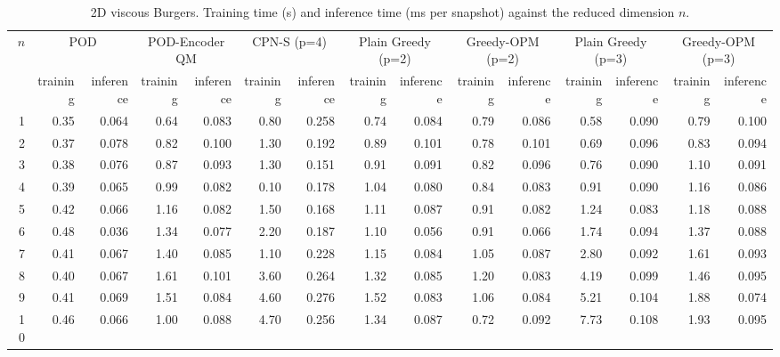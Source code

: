 \begin{table}[tb]
  \centering
  \caption{2D viscous Burgers. Training time (s) and inference time (ms per snapshot) against the reduced dimension \( n \).}
  \label{tab:burgers2d_timings}
  \small
  \setlength{\tabcolsep}{4pt}
  \begin{tabular}{rrrrrrrrrrrrrrr}
    \toprule
    \multirow{2}{*}{\( n \)} & \multicolumn{2}{c}{POD} & \multicolumn{2}{c}{POD-Encoder QM} & \multicolumn{2}{c}{CPN-S (p=4)} & \multicolumn{2}{c}{Plain Greedy (p=2)} & \multicolumn{2}{c}{Greedy-OPM (p=2)} & \multicolumn{2}{c}{Plain Greedy (p=3)} & \multicolumn{2}{c}{Greedy-OPM (p=3)} \\
    \cmidrule(lr){2-3} \cmidrule(lr){4-5} \cmidrule(lr){6-7} \cmidrule(lr){8-9} \cmidrule(lr){10-11} \cmidrule(lr){12-13} \cmidrule(lr){14-15}
     & training & inference & training & inference & training & inference & training & inference & training & inference & training & inference & training & inference \\
    \midrule
    1 & 0.35 & 0.064 & 0.64 & 0.083 & 0.80 & 0.258 & 0.74 & 0.084 & 0.79 & 0.086 & 0.58 & 0.090 & 0.79 & 0.100 \\
    2 & 0.37 & 0.078 & 0.82 & 0.100 & 1.30 & 0.192 & 0.89 & 0.101 & 0.78 & 0.101 & 0.69 & 0.096 & 0.83 & 0.094 \\
    3 & 0.38 & 0.076 & 0.87 & 0.093 & 1.30 & 0.151 & 0.91 & 0.091 & 0.82 & 0.096 & 0.76 & 0.090 & 1.10 & 0.091 \\
    4 & 0.39 & 0.065 & 0.99 & 0.082 & 0.10 & 0.178 & 1.04 & 0.080 & 0.84 & 0.083 & 0.91 & 0.090 & 1.16 & 0.086 \\
    5 & 0.42 & 0.066 & 1.16 & 0.082 & 1.50 & 0.168 & 1.11 & 0.087 & 0.91 & 0.082 & 1.24 & 0.083 & 1.18 & 0.088 \\
    6 & 0.48 & 0.036 & 1.34 & 0.077 & 2.20 & 0.187 & 1.10 & 0.056 & 0.91 & 0.066 & 1.74 & 0.094 & 1.37 & 0.088 \\
    7 & 0.41 & 0.067 & 1.40 & 0.085 & 1.10 & 0.228 & 1.15 & 0.084 & 1.05 & 0.087 & 2.80 & 0.092 & 1.61 & 0.093 \\
    8 & 0.40 & 0.067 & 1.61 & 0.101 & 3.60 & 0.264 & 1.32 & 0.085 & 1.20 & 0.083 & 4.19 & 0.099 & 1.46 & 0.095 \\
    9 & 0.41 & 0.069 & 1.51 & 0.084 & 4.60 & 0.276 & 1.52 & 0.083 & 1.06 & 0.084 & 5.21 & 0.104 & 1.88 & 0.074 \\
    10 & 0.46 & 0.066 & 1.00 & 0.088 & 4.70 & 0.256 & 1.34 & 0.087 & 0.72 & 0.092 & 7.73 & 0.108 & 1.93 & 0.095 \\
    \bottomrule
  \end{tabular}
\end{table}
